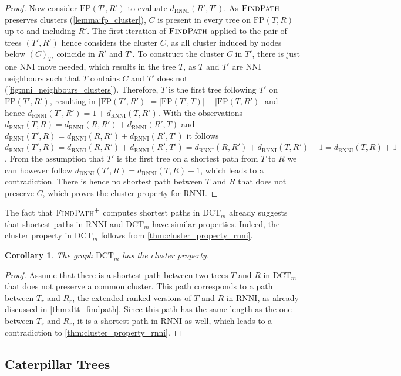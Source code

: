 \documentclass[11pt]{amsart}
\newtheorem{corollary}{Corollary}
\newcommand{\rnni}{\mathrm{RNNI}}
\newcommand{\findpath}{\textsc{FindPath}}
\newcommand{\nni}{\mathrm{NNI}}
\newcommand{\fp}{\mathrm{FP}}
\newcommand{\dct}{\mathrm{DCT}}
\begin{document}
\begin{proof}
	Now consider $\fp(T', R')$ to evaluate $d_{\rnni}(R', T')$.
	As $\findpath$ preserves clusters (\autoref{lemma:fp_cluster}), $C$ is present in every tree on $\fp(T,R)$ up to and including $R'$.
	The first iteration of $\findpath$ applied to the pair of trees $(T',R')$ hence considers the cluster $C$, as all cluster induced by nodes below $(C)_{T'}$ coincide in $R'$ and $T'$.
	To construct the cluster $C$ in $T'$, there is just one $\nni$ move needed, which results in the tree $T$, as $T$ and $T'$ are $\nni$ neighbours such that $T$ contains $C$ and $T'$ does not (\autoref{fig:nni_neighbours_clusters}).
	Therefore, $T$ is the first tree following $T'$ on $\fp(T',R')$, resulting in $|\fp(T',R')| = |\fp(T',T)| + |\fp(T,R')|$ and hence $d_{\rnni}(T',R') = 1 + d_{\rnni}(T,R')$.
	With the observations $d_{\rnni}(T,R) = d_{\rnni}(R,R') + d_{\rnni}(R',T)$ and $d_{\rnni}(T',R) = d_{\rnni}(R,R') + d_{\rnni}(R',T')$ it follows $d_{\rnni}(T',R) = d_{\rnni}(R,R') + d_{\rnni}(R',T') = d_{\rnni}(R,R') + d_{\rnni}(T,R') + 1 = d_{\rnni}(T,R) + 1$.
	From the assumption that $T'$ is the first tree on a shortest path from $T$ to $R$ we can however follow $d_{\rnni}(T',R) = d_{\rnni}(T,R) - 1$, which leads to a contradiction.
	There is hence no shortest path between $T$ and $R$ that does not preserve $C$, which proves the cluster property for $\rnni$.
\end{proof}

The fact that $\findpath^+$ computes shortest paths in $\dct_m$ already suggests that shortest paths in $\rnni$ and $\dct_m$ have similar properties.
Indeed, the cluster property in $\dct_m$ follows from \autoref{thm:cluster_property_rnni}.

\begin{corollary}
	The graph $\dct_m$ has the cluster property.
	\label{cor:cluster_property_dct}
\end{corollary}

\begin{proof}
	Assume that there is a shortest path between two trees $T$ and $R$ in $\dct_m$ that does not preserve a common cluster.
	This path corresponds to a path between $T_r$ and $R_r$, the extended ranked versions of $T$ and $R$ in $\rnni$, as already discussed in \autoref{thm:dtt_findpath}.
	Since this path has the same length as the one between $T_r$ and $R_r$, it is a shortest path in $\rnni$ as well, which leads to a contradiction to \autoref{thm:cluster_property_rnni}.
\end{proof}

\subsection{Caterpillar Trees}
\label{section:caterpillar_convex}
\end{document}

